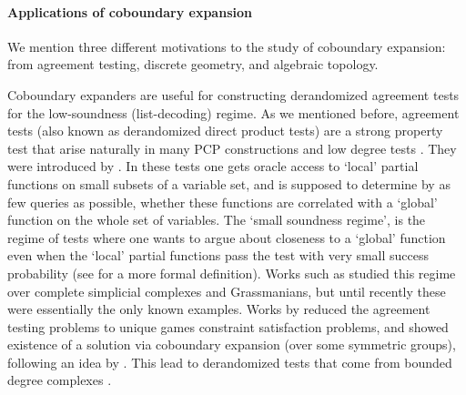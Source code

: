 

\paragraph{Applications of coboundary expansion}We mention three different motivations to the study of coboundary expansion: from agreement testing, discrete geometry, and algebraic topology.

Coboundary expanders are useful for constructing derandomized agreement tests for the low-soundness (list-decoding) regime. As we mentioned before, agreement tests (also known as derandomized direct product tests) are a strong property test that arise naturally in many PCP constructions \cite{dinur2007pcp, Raz-parrep,GolSaf97,ImpagliazzoKW2012} and low degree tests \cite{RuSu96,ArSu,RazS1997}. They were introduced by \cite{GolSaf97}. In these tests one gets oracle access to `local' partial functions on small subsets of a variable set, and is supposed to determine by as few queries as possible, whether these functions are correlated with a `global' function on the whole set of variables. The `small soundness regime', is the regime of tests where one wants to argue about closeness to a `global' function even when the `local' partial functions pass the test with very small success probability (see \cite{DG08} for a more formal definition). Works such as \cite{DG08,ImpagliazzoKW2012,DL17} studied this regime over complete simplicial complexes and Grassmanians, but until recently these were essentially the only known examples. Works by \cite{GotlibK2022,BafnaM2023,DiksteinD2023agr} reduced the agreement testing problems to unique games constraint satisfaction problems, and showed existence of a solution via coboundary expansion (over some symmetric groups), following an idea by \cite{DinurM2019}. This lead to derandomized tests that come from bounded degree complexes \cite{DiksteinDL2024,BafnaM2024}.

